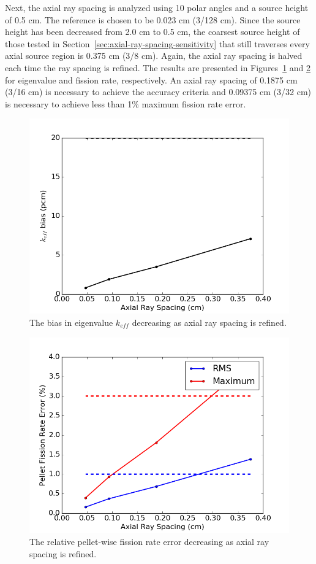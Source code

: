 Next, the axial ray spacing is analyzed using 10 polar angles and a source height of 0.5 cm. The reference is chosen to be 0.023 cm (3/128 cm). Since the source height has been decreased from 2.0 cm to 0.5 cm, the coarsest source height of those tested in Section~\ref{sec:axial-ray-spacing-sensitivity} that still traverses every axial source region is 0.375 cm (3/8 cm). Again, the axial ray spacing is halved each time the ray spacing is refined. The results are presented in Figures~\ref{fig:rodded-axial-rs-pcm} and \ref{fig:rodded-axial-rs-fr} for eigenvalue and fission rate, respectively. An axial ray spacing of 0.1875 cm (3/16 cm) is necessary to achieve the accuracy criteria and 0.09375 cm (3/32 cm) is necessary to achieve less than 1\% maximum fission rate error.

\begin{figure}[h!]
	\centering
	\includegraphics[width=0.7\linewidth]{figures/results/sensitivity/rodded_z_spacing_pcm.png}
	\caption[]{The bias in eigenvalue $k_{\textit{eff}}$ decreasing as axial ray spacing is refined.}
	\label{fig:rodded-axial-rs-pcm}
\end{figure}
\begin{figure}[h!]
	\centering
	\includegraphics[width=0.7\linewidth]{figures/results/sensitivity/rodded_z_spacing_fr.png}
	\caption[]{The relative pellet-wise fission rate error decreasing as axial ray spacing is refined.}
	\label{fig:rodded-axial-rs-fr}
\end{figure}

